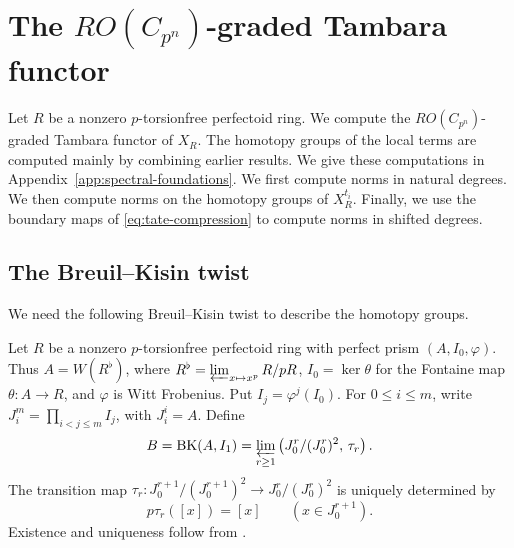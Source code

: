 \section{The \texorpdfstring{$RO(C_{p^n})$}{RO(Cpn)}-graded Tambara functor}
\label{sec:uniform}
Let $R$ be a nonzero $p$-torsionfree perfectoid ring. We compute the
$RO(C_{p^n})$-graded Tambara functor of $X_R$.
The homotopy groups of the local terms are computed mainly
by combining earlier results. We give these computations in
Appendix~\ref{app:spectral-foundations}.
We first compute norms in natural degrees.
We then compute norms on the homotopy groups of $X_R^{t_i}$.
Finally, we use the boundary maps of \eqref{eq:tate-compression}
to compute norms in shifted degrees.

\subsection{The Breuil--Kisin twist}\label{subsec:period-line}
We need the following
Breuil--Kisin twist to describe the homotopy groups.

\begin{definition}\label{def:period-line}
Let $R$ be a nonzero $p$-torsionfree perfectoid ring with perfect prism
$(A,I_0,\varphi)$. Thus $A=W(R^\flat)$, where
$R^\flat=\varprojlim_{x\mapsto x^p}R/pR$, $I_0=\ker\theta$ for the
Fontaine map $\theta:A\to R$, and $\varphi$ is Witt Frobenius.
Put $I_j=\varphi^j(I_0)$. For $0\le i\le m$, write
$J_i^m=\prod_{i<j\le m}I_j$, with $J_i^i=A$. Define
\begin{equation*}
B=\operatorname{BK}(A,I_1)
   =\varprojlim_{r\ge1}\left(J_0^r/(J_0^r)^2,\,\tau_r\right).
\end{equation*}
The transition map $\tau_r:J_0^{r+1}/(J_0^{r+1})^2\to J_0^r/(J_0^r)^2$
is uniquely determined by
\[
p\tau_r([x])=[x]\qquad(x\in J_0^{r+1}).
\]
Existence and uniqueness follow from
\cite[Corollary~2.2.10]{BhattLurie}.
\end{definition}

